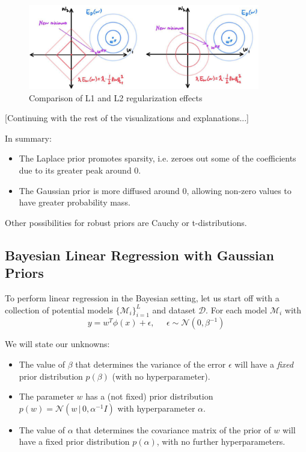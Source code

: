 \documentclass{article}
\begin{document}
    \begin{figure}[H]
      \centering
      \includegraphics[width=0.9\textwidth]{img/L1vsL2.jpg}
      \caption{Comparison of L1 and L2 regularization effects}
    \end{figure}

    [Continuing with the rest of the visualizations and explanations...]

    In summary:
    \begin{itemize}
      \item The Laplace prior promotes sparsity, i.e. zeroes out some of the coefficients due to its greater peak around $0$.
      \item The Gaussian prior is more diffused around $0$, allowing non-zero values to have greater probability mass.
    \end{itemize}

    Other possibilities for robust priors are Cauchy or t-distributions.

  \subsection{Bayesian Linear Regression with Gaussian Priors}

    To perform linear regression in the Bayesian setting, let us start off with a collection of potential models $\{\mathcal{M}_i\}_{i=1}^L$ and dataset $\mathcal{D}$. For each model $\mathcal{M}_i$ with
    \begin{equation}
      y = w^T \phi(x) + \epsilon, \;\;\;\;\; \epsilon \sim \mathcal{N}(0, \beta^{-1})
    \end{equation}

    We will state our unknowns:
    \begin{itemize}
      \item The value of $\beta$ that determines the variance of the error $\epsilon$ will have a \textit{fixed} prior distribution $p(\beta)$ (with no hyperparameter).
      \item The parameter $w$ has a (not fixed) prior distribution $p(w) = \mathcal{N}(w\,|\,0, \alpha^{-1} I)$ with hyperparameter $\alpha$.
      \item The value of $\alpha$ that determines the covariance matrix of the prior of $w$ will have a fixed prior distribution $p(\alpha)$, with no further hyperparameters.
    \end{itemize}
\end{document}
